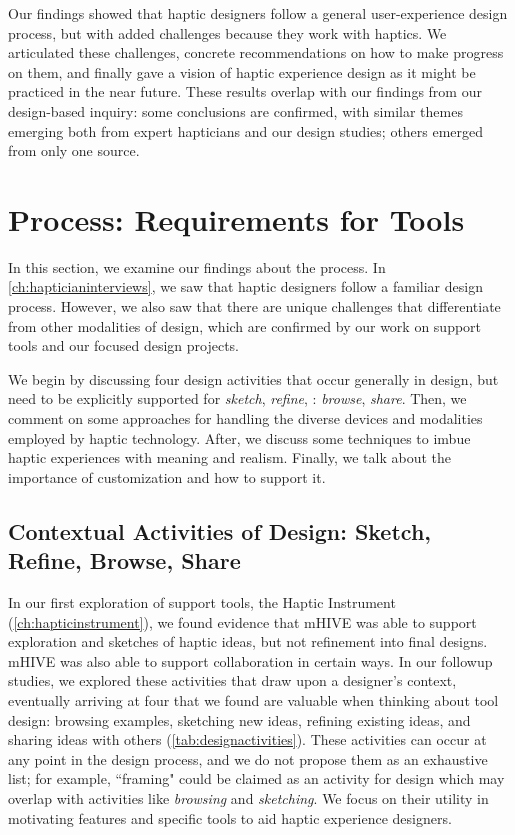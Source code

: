 Our findings showed that haptic designers follow a general user-experience design process, but with added challenges because they work with haptics.
We articulated these challenges,  concrete recommendations on how to make progress on them, and finally gave a vision of haptic experience design as it might be practiced in the near future.
These results overlap with our findings from our design-based inquiry: some conclusions are confirmed, with similar themes emerging both from expert hapticians and our design studies; others emerged from only one source.


%
%
\section{\haxd Process: Requirements for Tools}
In this section, we examine our findings about the \haxd process. %
In \autoref{ch:hapticianinterviews}, we saw that haptic designers follow a familiar design process.
However, we also saw that there are unique challenges that differentiate \haxd from other modalities of design, which are confirmed by our work on \haxd support tools and our focused design projects.

We begin by discussing four design activities that occur generally in design, but need to be explicitly supported for \emph{sketch}, \emph{refine}, \haxd: \emph{browse}, \emph{share}.
Then, we comment on some approaches for handling the diverse devices and modalities employed by haptic technology.
After, we discuss some techniques to imbue haptic experiences with meaning and realism.
Finally, we talk about the importance of customization and how to support it.

\subsection{Contextual Activities of Design: Sketch, Refine, Browse, Share}
In our first exploration of \haxd support tools, the Haptic Instrument (\autoref{ch:hapticinstrument}), we found evidence that mHIVE was able to support exploration and sketches of haptic ideas, but not refinement into final designs.
mHIVE was also able to support collaboration in certain ways.
In our followup studies, we explored these activities that draw upon a designer's context, eventually arriving at four that we found are valuable when thinking about tool design: browsing examples, sketching new ideas, refining existing ideas, and sharing ideas with others (\autoref{tab:designactivities}).
These activities can occur at any point in the design process, and we do not propose them as an exhaustive list; for example, ``framing" \cite{Schon1982,Warr2005} could be claimed as an activity for design which may overlap with activities like \emph{browsing} and \emph{sketching}.
We focus on their utility in motivating features and specific tools to aid haptic experience designers.




